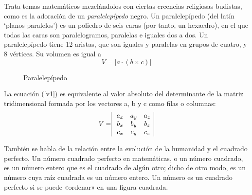 \documentclass[12pt,a4paper]{article}
\begin{document}
\begin{enumerate}
Trata temas matemáticos mezclándolos con ciertas creencias religiosas budistas, como es la adoración de un \textit{paralelepípedo} negro. Un paralelepípedo (del latín ‘planos paralelos’) es un poliedro de seis caras (por tanto, un hexaedro), en el que todas las caras son paralelogramos, paralelas e iguales dos a dos. Un paralelepípedo tiene 12 aristas, que son iguales y paralelas en grupos de cuatro, y 8 vértices. Su volumen es igual a 
\begin{equation}
\label{v1}
V=\vert a \cdot (b \times c)\vert
\end{equation}
\begin{figure}[htb]
\centering
{}
\caption{Paralelepípedo}
\label{paralel}
\end{figure}
La ecuación (\ref{v1}) es equivalente al valor absoluto del determinante de la matriz tridimensional formada por los vectores a, b y c como filas o columnas:
\begin{equation}
\label{v2}
V= \vline \begin{array}{ccc}
a_{x} & a_{y} & a_{z} \\
b_{x} & b_{y} & b_{z} \\
c_{x} & c_{y} & c_{z} \end{array} \vline
\end{equation}

También se habla de la relación entre la evolución de la humanidad y el cuadrado perfecto. Un número cuadrado perfecto en matemáticas, o un número cuadrado, es un número entero que es el cuadrado de algún otro; dicho de otro modo, es un número cuya raíz cuadrada es un número entero.
Un número es un cuadrado perfecto si se puede «ordenar» en una figura cuadrada.


\end{enumerate}
\end{document}
